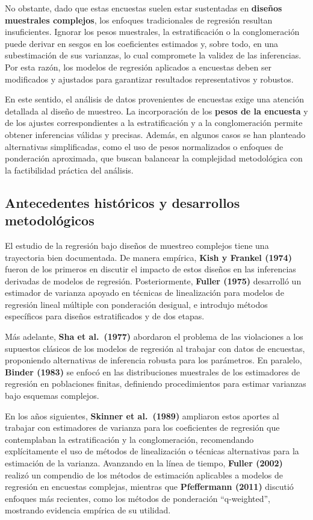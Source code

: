 \documentclass[
  12pt,
]{book}
\begin{document}
No obstante, dado que estas encuestas suelen estar sustentadas en \textbf{diseños muestrales complejos}, los enfoques tradicionales de regresión resultan insuficientes. Ignorar los pesos muestrales, la estratificación o la conglomeración puede derivar en sesgos en los coeficientes estimados y, sobre todo, en una subestimación de sus varianzas, lo cual compromete la validez de las inferencias. Por esta razón, los modelos de regresión aplicados a encuestas deben ser modificados y ajustados para garantizar resultados representativos y robustos.

En este sentido, el análisis de datos provenientes de encuestas exige una atención detallada al diseño de muestreo. La incorporación de los \textbf{pesos de la encuesta} y de los ajustes correspondientes a la estratificación y a la conglomeración permite obtener inferencias válidas y precisas. Además, en algunos casos se han planteado alternativas simplificadas, como el uso de pesos normalizados o enfoques de ponderación aproximada, que buscan balancear la complejidad metodológica con la factibilidad práctica del análisis.

\subsection{Antecedentes históricos y desarrollos metodológicos}\label{antecedentes-histuxf3ricos-y-desarrollos-metodoluxf3gicos}

El estudio de la regresión bajo diseños de muestreo complejos tiene una trayectoria bien documentada. De manera empírica, \textbf{Kish y Frankel (1974)} fueron de los primeros en discutir el impacto de estos diseños en las inferencias derivadas de modelos de regresión. Posteriormente, \textbf{Fuller (1975)} desarrolló un estimador de varianza apoyado en técnicas de linealización para modelos de regresión lineal múltiple con ponderación desigual, e introdujo métodos específicos para diseños estratificados y de dos etapas.

Más adelante, \textbf{Sha et al.~(1977)} abordaron el problema de las violaciones a los supuestos clásicos de los modelos de regresión al trabajar con datos de encuestas, proponiendo alternativas de inferencia robusta para los parámetros. En paralelo, \textbf{Binder (1983)} se enfocó en las distribuciones muestrales de los estimadores de regresión en poblaciones finitas, definiendo procedimientos para estimar varianzas bajo esquemas complejos.

En los años siguientes, \textbf{Skinner et al.~(1989)} ampliaron estos aportes al trabajar con estimadores de varianza para los coeficientes de regresión que contemplaban la estratificación y la conglomeración, recomendando explícitamente el uso de métodos de linealización o técnicas alternativas para la estimación de la varianza. Avanzando en la línea de tiempo, \textbf{Fuller (2002)} realizó un compendio de los métodos de estimación aplicables a modelos de regresión en encuestas complejas, mientras que \textbf{Pfeffermann (2011)} discutió enfoques más recientes, como los métodos de ponderación ``q-weighted'', mostrando evidencia empírica de su utilidad.
\end{document}
